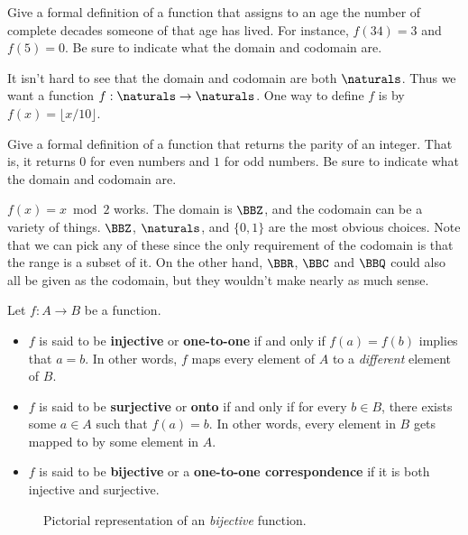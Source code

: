 \begin{exa}
Give a formal definition of a function that assigns to an age the number 
of complete decades someone of that age has lived.
For instance, $f(34)=3$ and $f(5)=0$.
Be sure to indicate what the domain and codomain are.
\begin{sol}
It isn't hard to see that the domain and codomain are both $\naturals$.
Thus we want a function $f:\naturals\to\naturals$.
One way to define $f$ is by $f(x)=\lfloor x/10 \rfloor$.
\end{sol}
\end{exa}

\begin{exer}
Give a formal definition of a function that returns the parity of an integer.
That is, it returns $0$ for even numbers and $1$ for odd numbers.
Be sure to indicate what the domain and codomain are.

\noindent
\answerlinetwo
\begin{answer}
$f(x)=x\bmod 2$ works.  The domain is $\BBZ$, and the codomain can be a variety
of things.  $\BBZ$, $\naturals$, and $\{0,1\}$ are the most obvious choices.
Note that we can pick any of these since the only requirement of the codomain is 
that the range is a subset of it.  On the other hand, $\BBR$, $\BBC$ and $\BBQ$
could also all be given as the codomain, but they wouldn't make nearly as much sense.
\end{answer}
\end{exer}

\begin{df}
Let $f : A\to B$ be a function. 
\begin{itemize}
\item
$f$ is said to be {\bf injective} or {\bf one-to-one} 
if and only if $f(a)=f(b)$ implies that $a=b$.
In other words, $f$ maps every element of $A$ to a {\em different} element of $B$.
\item
$f$ is said to be {\bf surjective} or {\bf onto} if and only if for every $b\in B$,
there exists some $a\in A$ such that $f(a)=b$.
In other words, every element in $B$ gets mapped to by some element in $A$.
\item
$f$ is said to be {\bf bijective} or a {\bf one-to-one correspondence} 
if it is both injective and surjective.
\end{itemize}
\end{df}

\begin{figure}[ht]
\begin{minipage}{2in}

\footnotesize\caption{Pictorial representation of a {\em one-to-one} function.}
\end{minipage}
\hfill
\begin{minipage}{2in}

\footnotesize\caption{Pictorial representation of an {\em onto} function.}
\end{minipage}
\hfill
\begin{minipage}{2in}

\footnotesize\caption{Pictorial representation of an {\em bijective} function.}
\end{minipage}
\end{figure}

